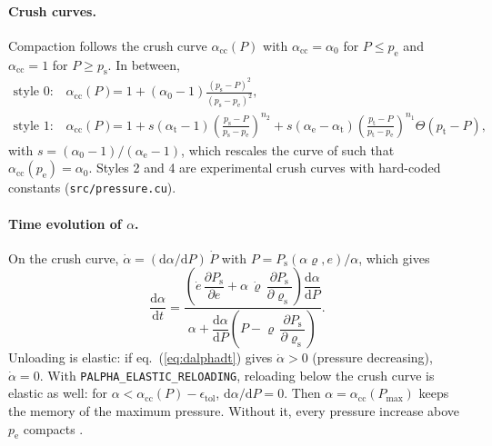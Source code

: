 \documentclass[10pt,fleqn,twoside]{article}
\newcommand{\code}[1]{\texttt{#1}}
\newcommand{\sw}[1]{\texttt{#1}}
\newcommand{\dd}{\mathrm{d}}
\begin{document}
\paragraph{Crush curves.} Compaction follows the crush curve $\alpha_\mathrm{cc}(P)$ with $\alpha_\mathrm{cc} =
\alpha_0$ for $P \leq p_\mathrm{e}$ and $\alpha_\mathrm{cc} = 1$ for $P \geq p_\mathrm{s}$. In between,
\begin{align}
 \text{style 0:}\quad \alpha_\mathrm{cc}(P) &= 1 + (\alpha_0-1)\frac{(p_\mathrm{s}-P)^2}{(p_\mathrm{s}-p_\mathrm{e})^2},\\
 \text{style 1:}\quad \alpha_\mathrm{cc}(P) &= 1 + s(\alpha_\mathrm{t}-1)\left(\frac{p_\mathrm{s}-P}{p_\mathrm{s}-p_\mathrm{e}}\right)^{n_2}
   + s(\alpha_\mathrm{e}-\alpha_\mathrm{t})\left(\frac{p_\mathrm{t}-P}{p_\mathrm{t}-p_\mathrm{e}}\right)^{n_1}\Theta(p_\mathrm{t}-P),
\end{align}
with $s = (\alpha_0-1)/(\alpha_\mathrm{e}-1)$, which rescales the curve of \citet{2008Icar..198..242J} such that
$\alpha_\mathrm{cc}(p_\mathrm{e}) = \alpha_0$. Styles 2 and 4 are experimental crush curves with hard-coded
constants (\code{src/pressure.cu}).

\paragraph{Time evolution of $\alpha$.} On the crush curve,
$\dot\alpha = (\dd\alpha/\dd P)\,\dot P$ with $P = P_\mathrm{s}(\alpha\varrho, e)/\alpha$, which gives
\citep[eq.~25]{2008Icar..198..242J}
\begin{equation}
 \label{eq:dalphadt}
 \frac{\dd\alpha}{\dd t} = \frac{\left(\dot e\,\dfrac{\partial P_\mathrm{s}}{\partial e}
   + \alpha\,\dot\varrho\,\dfrac{\partial P_\mathrm{s}}{\partial\varrho_\mathrm{s}}\right)\dfrac{\dd\alpha}{\dd P}}
   {\alpha + \dfrac{\dd\alpha}{\dd P}\left(P - \varrho\,\dfrac{\partial P_\mathrm{s}}{\partial\varrho_\mathrm{s}}\right)}.
\end{equation}
Unloading is elastic: if eq.~(\ref{eq:dalphadt}) gives $\dot\alpha > 0$ (pressure decreasing), $\dot\alpha = 0$.
With \sw{PALPHA\_ELASTIC\_RELOADING}, reloading below the crush curve is elastic as well: for
$\alpha < \alpha_\mathrm{cc}(P) - \epsilon_\mathrm{tol}$, $\dd\alpha/\dd P = 0$. Then $\alpha =
\alpha_\mathrm{cc}(P_\mathrm{max})$ keeps the memory of the maximum pressure. Without it, every pressure increase
above $p_\mathrm{e}$ compacts \citep[eqs.~22--23]{2008Icar..198..242J}.
\end{document}
